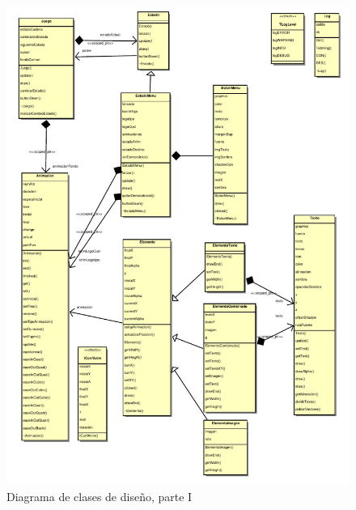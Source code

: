 \begin{figure}[htp!]
  \centering
  \includegraphics[width=\textwidth]{5_diseno/diagrama1}
  \caption{Diagrama de clases de diseño, parte I}
  \label{fig:diagrama_clases_1}
\end{figure}

